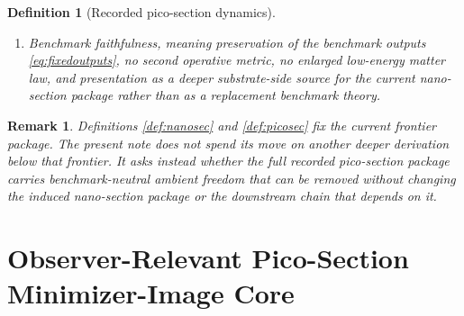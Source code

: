 \documentclass[11pt]{article}
\newcommand{\NanoSectionShell}[1]{\mathcal Z_{#1}^{\mathrm{nanosec}}}
\newcommand{\PicoSectionProj}[1]{\Pi_{#1}^{\mathrm{picosec}}}
\newcommand{\PicoSectionFiber}[2]{\mathcal F_{#1}^{\mathrm{picosec}}(#2)}
\newcommand{\PicoSectionFunctional}[1]{\mathscr P_{#1}^{\mathrm{picosec}}}
\newcommand{\PicoSectionShell}[1]{\mathcal Z_{#1}^{\mathrm{picosec}}}
\newtheorem{definition}{Definition}
\newtheorem{remark}{Remark}
\begin{document}
\begin{definition}[Recorded pico-section dynamics]
\begin{enumerate}
\[\begin{array}{l}
    \PicoSectionFunctional{\sigma}(r)
    =
    \displaystyle\min_{s\in\PicoSectionFiber{\sigma}{\PicoSectionProj{\sigma}(r)}}
    \PicoSectionFunctional{\sigma}(s)
    \end{array}
    \right\},
    \]
    and
    \[
    \PicoSectionProj{\sigma}\big|_{\PicoSectionShell{\sigma}}
    :
    \PicoSectionShell{\sigma}
    \xrightarrow{\cong}
    \NanoSectionShell{\sigma}
    \]
    is a diffeomorphism.
    \item Benchmark faithfulness, meaning preservation of the benchmark outputs \eqref{eq:fixedoutputs}, no second operative metric, no enlarged low-energy matter law, and presentation as a deeper substrate-side source for the current nano-section package rather than as a replacement benchmark theory.
\end{enumerate}
\end{definition}

\begin{remark}
Definitions \ref{def:nanosec} and \ref{def:picosec} fix the current frontier package. The present note does not spend its move on another deeper derivation below that frontier. It asks instead whether the full recorded pico-section package carries benchmark-neutral ambient freedom that can be removed without changing the induced nano-section package or the downstream chain that depends on it.
\end{remark}

\section{Observer-Relevant Pico-Section Minimizer-Image Core}
\end{document}

